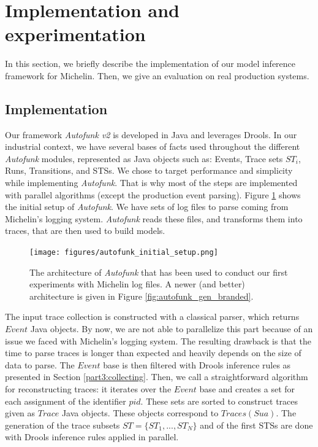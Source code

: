 
\section{Implementation and experimentation}
\label{sec:modelinf:prodsystems:results}

In this section, we briefly describe the implementation of our
model inference framework for Michelin. Then, we give an
evaluation on real production systems.

\subsection{Implementation}
\label{sec:prodsystems:impl-exp-collect}

Our framework \textit{Autofunk v2} is developed in Java and
leverages Drools.  In our industrial context, we have several
bases of facts used throughout the different \textit{Autofunk}
modules, represented as Java objects such as: Events, Trace sets
$ST_i$, Runs, Transitions, and STSs. We chose to target
performance and simplicity while implementing \textit{Autofunk}.
That is why most of the steps are implemented with parallel
algorithms (except the production event parsing). Figure
\ref{fig:autofunk_initial_setup} shows the initial setup of
\textit{Autofunk}. We have sets of log files to parse coming from
Michelin's logging system. \textit{Autofunk} reads these files,
and transforms them into traces, that are then used to build
models.

\begin{figure}[ht]
    \texttt{[image: figures/autofunk\_initial\_setup.png]}

    \caption{The architecture of \textit{Autofunk} that has been
        used to conduct our first experiments with Michelin log
        files. A newer (and better) architecture is given in
        Figure \ref{fig:autofunk_gen_branded}.}
    \label{fig:autofunk_initial_setup}
\end{figure}

The input trace collection is constructed with a classical
parser, which returns $Event$ Java objects. By now, we are not
able to parallelize this part because of an issue we faced with
Michelin's logging system. The resulting drawback is that the
time to parse traces is longer than expected and heavily depends
on the size of data to parse. The $Event$ base is then filtered
with Drools inference rules as presented in Section
\ref{part3:collecting}.  Then, we call a straightforward
algorithm for reconstructing traces: it iterates over the $Event$
base and creates a set for each assignment of the identifier
$pid$. These sets are sorted to construct traces given as $Trace$
Java objects. These objects correspond to $Traces(Sua)$. The
generation of the trace subsets $ST= \{ST_1,...,ST_N\}$ and of
the first STSs are done with Drools inference rules applied in
parallel.

